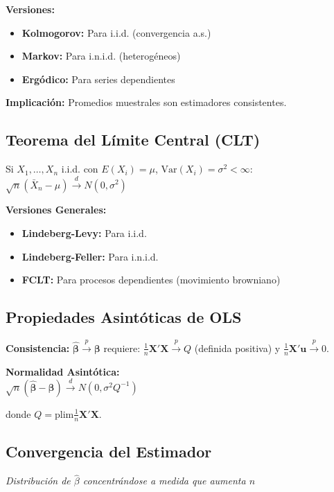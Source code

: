 \documentclass[9pt, spanish, twoside]{article}
\newcommand{\critical}[1]{\textcolor{CriticalRed}{\textbf{#1}}}
\newcommand{\eqbox}[1]{\colorbox{TitaniumGray}{$\displaystyle #1$}}
\begin{document}
\begin{multicols*}{3}
\textbf{Versiones:}
\begin{itemize}[leftmargin=8pt, noitemsep, topsep=2pt]
    \item \textbf{Kolmogorov:} Para i.i.d. (convergencia a.s.)
    \item \textbf{Markov:} Para i.n.i.d. (heterogéneos)
    \item \textbf{Ergódico:} Para series dependientes
\end{itemize}

\critical{Implicación:} Promedios muestrales son estimadores consistentes.

\subsection{Teorema del Límite Central (CLT)}
Si $X_1, \ldots, X_n$ i.i.d. con $E(X_i) = \mu$, $\text{Var}(X_i) = \sigma^2 < \infty$:
\eqbox{\sqrt{n}(\bar{X}_n - \mu) \xrightarrow{d} N(0, \sigma^2)}

\textbf{Versiones Generales:}
\begin{itemize}[leftmargin=8pt, noitemsep, topsep=2pt]
    \item \textbf{Lindeberg-Levy:} Para i.i.d.
    \item \textbf{Lindeberg-Feller:} Para i.n.i.d.
    \item \textbf{FCLT:} Para procesos dependientes (movimiento browniano)
\end{itemize}

\subsection{Propiedades Asintóticas de OLS}
\textbf{Consistencia:}
$\hat{\boldsymbol{\beta}} \xrightarrow{p} \boldsymbol{\beta}$
requiere: $\frac{1}{n}\mathbf{X}'\mathbf{X} \xrightarrow{p} Q$ (definida positiva) y $\frac{1}{n}\mathbf{X}'\mathbf{u} \xrightarrow{p} 0$.

\textbf{Normalidad Asintótica:}\\[10pt]
\eqbox{\sqrt{n}(\hat{\boldsymbol{\beta}} - \boldsymbol{\beta}) \xrightarrow{d} N(0, \sigma^2 Q^{-1})}

donde $Q = \text{plim}\frac{1}{n}\mathbf{X}'\mathbf{X}$.

\begin{center}
\vspace{4pt}
\subsection{Convergencia del Estimador}
\scriptsize\textit{Distribución de $\hat{\beta}$ concentrándose a medida que aumenta $n$}
\vspace{6pt}


\end{center}
\end{multicols*}
\end{document}
